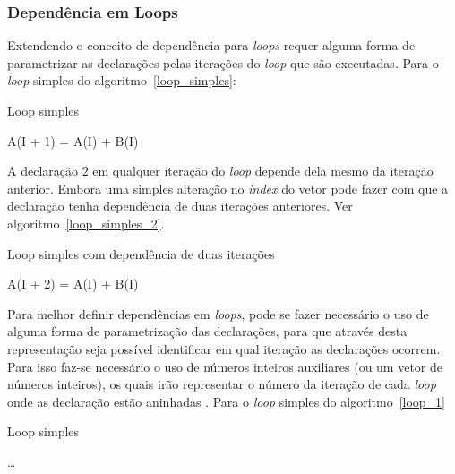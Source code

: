 \subsubsection{Dependência em Loops}

Extendendo o conceito de dependência para \textit{loops} requer alguma forma de
parametrizar as declarações pelas iterações do \textit{loop} que são
executadas.
Para o \textit{loop} simples do algoritmo~\ref{loop_simples}:

\begin{algorithm}
        \caption{Loop simples}
        \label{loop_simples}
        \begin{algorithmic}[1]
                \STATE A(I + 1) = A(I) + B(I) 
        \ENDFOR
        \end{algorithmic}
\end{algorithm}

A declaração $2$ em qualquer iteração do \textit{loop} depende dela mesmo da
iteração anterior. Embora uma simples alteração no \textit{index} do vetor pode
fazer com que a declaração tenha dependência de duas iterações anteriores.
Ver algoritmo~\ref{loop_simples_2}.

\begin{algorithm}
        \caption{Loop simples com dependência de duas iterações}
        \label{loop_simples_2}
        \begin{algorithmic}[1]
                \STATE A(I + 2) = A(I) + B(I) 
        \ENDFOR
        \end{algorithmic}
\end{algorithm}

Para melhor definir dependências em \textit{loops},  pode se fazer necessário o
uso de alguma forma de parametrização das declarações, para que através desta
representação seja possível identificar em qual iteração as declarações ocorrem.
Para isso faz-se necessário o uso de números inteiros auxiliares (ou um vetor de
números inteiros), os quais irão representar o número da iteração de cada 
\textit{loop} onde as declaração estão aninhadas \cite{hpcfpc}.
Para o \textit{loop} simples do algoritmo~\ref{loop_1}

\begin{algorithm}
        \caption{Loop simples}
        \label{loop_1}
        \begin{algorithmic}[1]
                \STATE \ldots
                \ENDFOR
        \end{algorithmic}
\end{algorithm}

